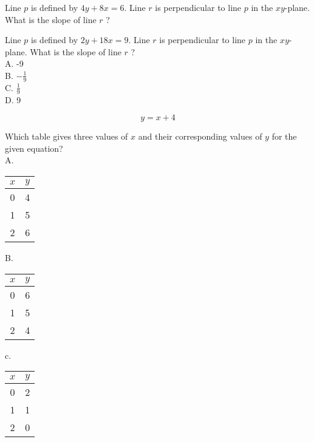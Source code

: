 Line $p$ is defined by $4 y+8 x=6$. Line $r$ is perpendicular 
to line $p$ in the $x y$-plane. What is the slope of line $r$ ?









Line $p$ is defined by $2 y+18 x=9$. Line $r$ is perpendicular 
to line $p$ in the $x y$-plane. What is the slope of line $r$ ?\\
A. -9\\
B. $-\frac{1}{9}$\\
C. $\frac{1}{9}$\\
D. 9










$$
y=x+4
$$

Which table gives three values of $x$ and their corresponding values of $y$ for the given equation?\\
A.

\begin{center}
\begin{tabular}{|c|c|}
\hline
$x$ & $y$ \\
\hline
0 & 4 \\
\hline
1 & 5 \\
\hline
2 & 6 \\
\hline
\end{tabular}
\end{center}

B.

\begin{center}
\begin{tabular}{|c|c|}
\hline
$x$ & $y$ \\
\hline
0 & 6 \\
\hline
1 & 5 \\
\hline
2 & 4 \\
\hline
\end{tabular}
\end{center}

c.

\begin{center}
\begin{tabular}{|c|c|}
\hline
$x$ & $y$ \\
\hline
0 & 2 \\
\hline
1 & 1 \\
\hline
2 & 0 \\
\hline
\end{tabular}
\end{center}

